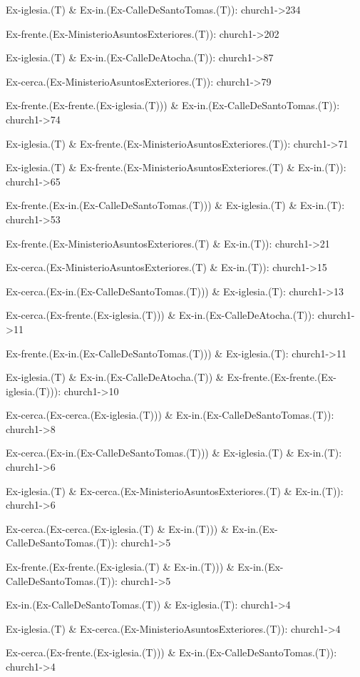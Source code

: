 Ex-iglesia.(T) \& Ex-in.(Ex-CalleDeSantoTomas.(T)): church1->234

Ex-frente.(Ex-MinisterioAsuntosExteriores.(T)): church1->202

Ex-iglesia.(T) \& Ex-in.(Ex-CalleDeAtocha.(T)): church1->87

Ex-cerca.(Ex-MinisterioAsuntosExteriores.(T)): church1->79

Ex-frente.(Ex-frente.(Ex-iglesia.(T))) \& Ex-in.(Ex-CalleDeSantoTomas.(T)): church1->74

Ex-iglesia.(T) \& Ex-frente.(Ex-MinisterioAsuntosExteriores.(T)): church1->71

Ex-iglesia.(T) \& Ex-frente.(Ex-MinisterioAsuntosExteriores.(T) \& Ex-in.(T)): church1->65

Ex-frente.(Ex-in.(Ex-CalleDeSantoTomas.(T))) \& Ex-iglesia.(T) \& Ex-in.(T): church1->53

Ex-frente.(Ex-MinisterioAsuntosExteriores.(T) \& Ex-in.(T)): church1->21

Ex-cerca.(Ex-MinisterioAsuntosExteriores.(T) \& Ex-in.(T)): church1->15

Ex-cerca.(Ex-in.(Ex-CalleDeSantoTomas.(T))) \& Ex-iglesia.(T): church1->13

Ex-cerca.(Ex-frente.(Ex-iglesia.(T))) \& Ex-in.(Ex-CalleDeAtocha.(T)): church1->11

Ex-frente.(Ex-in.(Ex-CalleDeSantoTomas.(T))) \& Ex-iglesia.(T): church1->11

Ex-iglesia.(T) \& Ex-in.(Ex-CalleDeAtocha.(T)) \& Ex-frente.(Ex-frente.(Ex-iglesia.(T))): church1->10

Ex-cerca.(Ex-cerca.(Ex-iglesia.(T))) \& Ex-in.(Ex-CalleDeSantoTomas.(T)): church1->8

Ex-cerca.(Ex-in.(Ex-CalleDeSantoTomas.(T))) \& Ex-iglesia.(T) \& Ex-in.(T): church1->6

Ex-iglesia.(T) \& Ex-cerca.(Ex-MinisterioAsuntosExteriores.(T) \& Ex-in.(T)): church1->6

Ex-cerca.(Ex-cerca.(Ex-iglesia.(T) \& Ex-in.(T))) \& Ex-in.(Ex-CalleDeSantoTomas.(T)): church1->5

Ex-frente.(Ex-frente.(Ex-iglesia.(T) \& Ex-in.(T))) \& Ex-in.(Ex-CalleDeSantoTomas.(T)): church1->5

Ex-in.(Ex-CalleDeSantoTomas.(T)) \& Ex-iglesia.(T): church1->4

Ex-iglesia.(T) \& Ex-cerca.(Ex-MinisterioAsuntosExteriores.(T)): church1->4

Ex-cerca.(Ex-frente.(Ex-iglesia.(T))) \& Ex-in.(Ex-CalleDeSantoTomas.(T)): church1->4

